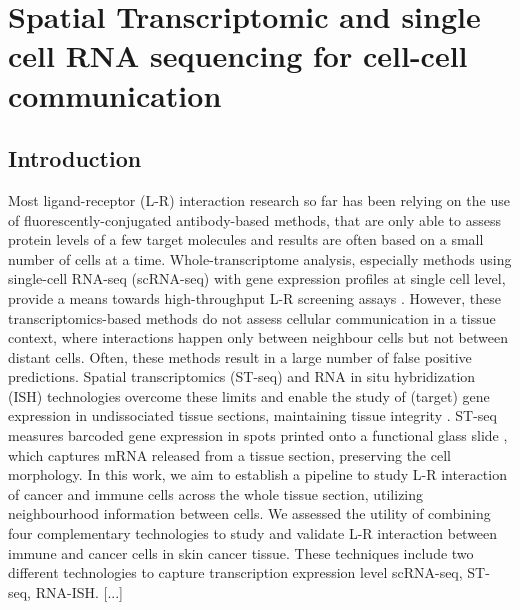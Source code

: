 

\chapter[Spatial Transcriptomic and single cell RNA sequencing for cell-cell communication]{Spatial Transcriptomic and single cell RNA sequencing for cell-cell communication}
\label{Chap:2}	%
\pagestyle{headings}
\section{Introduction}
\label{Sec:2.1_intro}	%

Most ligand-receptor (L-R) interaction research so far has been relying on the use of fluorescently-conjugated antibody-based methods, that are only able to assess protein levels of a few target molecules and results are often based on a small number of cells at a time. Whole-transcriptome analysis, especially methods using single-cell RNA-seq (scRNA-seq) with gene expression profiles at single cell level, provide a means towards high-throughput L-R screening assays \cite{browaeys2020nichenet, efremova2020cellphonedb}. However, these transcriptomics-based methods do not assess cellular communication in a tissue context, where interactions happen only between neighbour cells but not between distant cells. Often, these methods result in a large number of false positive predictions. Spatial transcriptomics (ST-seq) and RNA in situ hybridization (ISH) technologies overcome these limits and enable the study of (target) gene expression in undissociated tissue sections, maintaining tissue integrity \cite{salmen2018barcoded}. ST-seq measures barcoded gene expression in spots printed onto a functional glass slide \cite{salmen2018barcoded}, which captures mRNA released from a tissue section, preserving the cell morphology. In this work, we aim to establish a pipeline to study L-R interaction of cancer and immune cells across the whole tissue section, utilizing neighbourhood information between cells. We assessed the utility of combining four complementary technologies to study and validate L-R interaction between immune and cancer cells in skin cancer tissue. These techniques include two different technologies to capture transcription expression level scRNA-seq, ST-seq, RNA-ISH.  [...]

